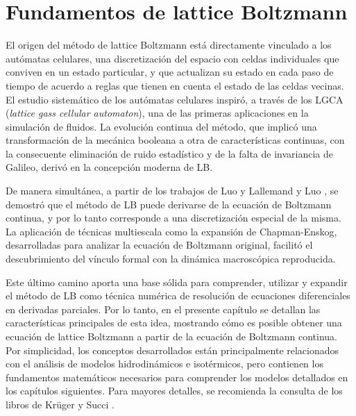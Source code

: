 \chapter{Fundamentos de lattice Boltzmann}
\label{chap:fundamentos}

El origen del m\'etodo de lattice Boltzmann est\'a directamente vinculado a los aut\'omatas celulares, una discretizaci\'on del espacio con celdas individuales que conviven en un estado particular, y que actualizan su estado en cada paso de tiempo de acuerdo a reglas que tienen en cuenta el estado de las celdas vecinas. El estudio sistem\'atico de los aut\'omatas celulares inspir\'o, a trav\'es de los LGCA (\emph{lattice gass cellular automaton}), una de las primeras aplicaciones en la simulaci\'on de fluidos. La evoluci\'on continua del m\'etodo, que implic\'o una transformaci\'on de la mec\'anica booleana a otra de caracter\'isticas continuas, con la consecuente eliminaci\'on de ruido estad\'istico y de la falta de invariancia de Galileo, deriv\'o en la concepci\'on moderna de LB.

De manera simult\'anea, a partir de los trabajos de Luo \cite{luo_unified_1998} y Lallemand y Luo \cite{lallemand_theory_2000}, se demostr\'o que el m\'etodo de LB puede derivarse de la ecuaci\'on de Boltzmann continua, y por lo tanto corresponde a una discretizaci\'on especial de la misma. La aplicaci\'on de t\'ecnicas multiescala como la expansi\'on de Chapman-Enskog, desarrolladas para analizar la ecuaci\'on de Boltzmann original, facilit\'o el descubrimiento del v\'inculo formal con la din\'amica macrosc\'opica reproducida.

Este \'ultimo camino aporta una base s\'olida para comprender, utilizar y expandir el m\'etodo de LB como t\'ecnica num\'erica de resoluci\'on de ecuaciones diferenciales en derivadas parciales. Por lo tanto, en el presente cap\'itulo se detallan las caracter\'isticas principales de esta idea, mostrando c\'omo es posible obtener una ecuaci\'on de lattice Boltzmann a partir de la ecuaci\'on de Boltzmann continua. Por simplicidad, los conceptos desarrollados est\'an principalmente relacionados con el an\'alisis de modelos hidrodin\'amicos e isot\'ermicos, pero contienen los fundamentos matem\'aticos necesarios para comprender los modelos detallados en los cap\'itulos siguientes. Para mayores detalles, se recomienda la consulta de los libros de Kr\"uger \cite{kruger_lattice_2017} y Succi \cite{succi_lattice_2018}.
\newpage

